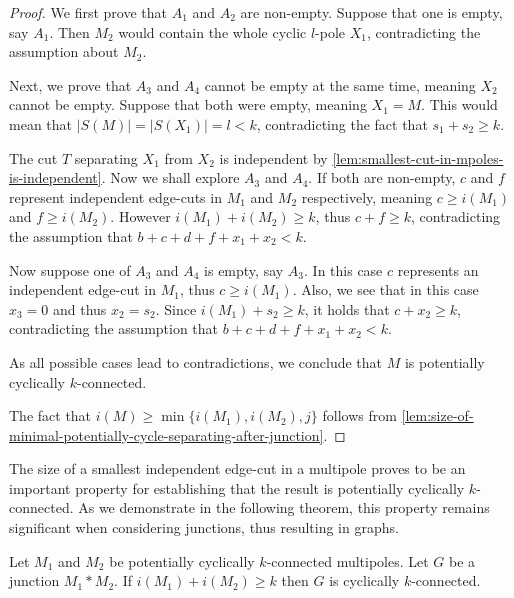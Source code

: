 \documentclass[12pt, twoside]{book}
\begin{document}
\begin{proof}
	We first prove that $A_1$ and $A_2$ are non-empty. Suppose that one is empty, say $A_1$. Then $M_2$ would contain the whole cyclic $l$-pole $X_1$, contradicting the assumption about $M_2$.
	
	Next, we prove that $A_3$ and $A_4$ cannot be empty at the same time, meaning $X_2$ cannot be empty. Suppose that both were empty, meaning $X_1=M$. This would mean that $|S(M)|=|S(X_1)|=l<k$, contradicting the fact that $s_1+s_2\geq k$.
	
	The cut $T$ separating $X_1$ from $X_2$ is independent by \cref{lem:smallest-cut-in-mpoles-is-independent}. Now we shall explore $A_3$ and $A_4$. If both are non-empty, $c$ and $f$ represent independent edge-cuts in $M_1$ and $M_2$ respectively, meaning ${c\geq i(M_1)}$ and ${f\geq i(M_2)}$. However ${i(M_1)+i(M_2)\geq k}$, thus $c+f\geq k$, contradicting the assumption that ${b+c+d+f+x_1+x_2<k}$.
	
	Now suppose one of $A_3$ and $A_4$ is empty, say $A_3$. In this case $c$ represents an independent edge-cut in $M_1$, thus $c\geq i(M_1)$. Also, we see that in this case $x_3=0$ and thus $x_2=s_2$. Since $i(M_1)+s_2\geq k$, it holds that $c+x_2\geq k$, contradicting the assumption that ${b+c+d+f+x_1+x_2<k}$.
	
	As all possible cases lead to contradictions, we conclude that $M$ is potentially cyclically \mbox{$k$-connected}.
	
	The fact that ${i(M)\geq \min\{i(M_1), i(M_2), j\}}$ follows from \cref{lem:size-of-minimal-potentially-cycle-separating-after-junction}.
\end{proof}

The size of a smallest independent edge-cut in a multipole proves to be an important property for establishing that the result is potentially cyclically $k$-connected. As we demonstrate in the following theorem, this property remains significant when considering junctions, thus resulting in graphs.

\begin{theorem}\label{th:cyclic-edge-connectivity-of-potentially-with-independent-cuts}
	Let $M_1$ and $M_2$ be potentially cyclically $k$-connected multipoles. Let $G$ be a junction $M_1*M_2$. If $i(M_1)+i(M_2)\geq k$ then $G$ is cyclically $k$-connected.
\end{theorem}
\end{document}
